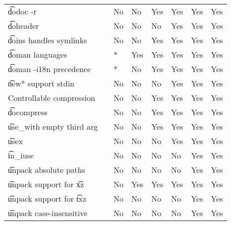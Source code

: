 \begin{landscape}
\begin{longtable}{llP{7.5em}P{7.5em}P{7.5em}P{7.5em}P{7.5em}P{7.5em}}
\t{dodoc -r} &  &
    No & No & Yes & Yes & Yes & Yes \\

\t{doheader} &  &
    No & No & No & Yes & Yes & Yes \\

\t{doins} handles symlinks &  &
    No & No & Yes & Yes & Yes & Yes \\

\t{doman} languages &  &
    * & Yes & Yes & Yes & Yes & Yes \\

\t{doman -i18n} precedence &  &
    * & No & Yes & Yes & Yes & Yes \\

\t{new*} support stdin &  &
    No & No & No & Yes & Yes & Yes \\

Controllable compression &  &
    No & No & Yes & Yes & Yes & Yes \\

\t{docompress} &  &
    No & No & Yes & Yes & Yes & Yes \\

\t{use_with} empty third arg &  &
    No & No & Yes & Yes & Yes & Yes \\

\t{usex} &  &
    No & No & No & Yes & Yes & Yes \\

\t{in_iuse} &  &
    No & No & No & No & Yes & Yes \\

\t{unpack} absolute paths &  &
    No & No & No & No & Yes & Yes \\

\t{unpack} support for \t{xz} &  &
    No & Yes & Yes & Yes & Yes & Yes \\

\t{unpack} support for \t{txz} &  &
    No & No & No & No & Yes & Yes \\

\t{unpack} case-insensitive &  &
    No & No & No & No & Yes & Yes \\


\end{longtable}
\end{landscape}
